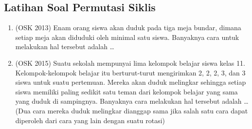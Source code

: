 \subsection{Latihan Soal Permutasi Siklis}
\begin{enumerate}
    \item (OSK 2013) Enam orang siswa akan duduk pada tiga meja bundar, dimana setiap meja akan diduduki oleh minimal satu siswa. Banyaknya cara untuk melakukan hal tersebut adalah \ldots

    \item (OSK 2015) Suatu sekolah mempunyai lima kelompok belajar siswa kelas 11. Kelompok-kelompok belajar itu berturut-turut mengirimkan 2, 2, 2, 3, dan 3 siswa untuk suatu pertemuan. Mereka akan duduk melingkar sehingga setiap siswa memiliki paling sedikit satu teman dari kelompok belajar yang sama yang duduk di sampingnya. Banyaknya cara melakukan hal tersebut adalah \ldots\\
    (Dua cara mereka duduk melingkar dianggap sama jika salah satu cara dapat diperoleh dari cara yang lain dengan suatu rotasi)
    
\end{enumerate}